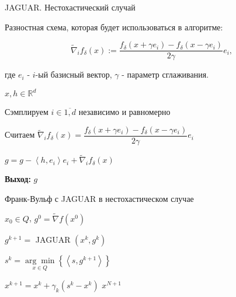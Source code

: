 \documentclass{beamer}
\newcommand{\dotprod}[2]{\left\langle #1,#2 \right\rangle}
\begin{document}
\begin{frame}{JAGUAR. Нестохастический случай}

    Разностная схема, которая будет использоваться в алгоритме:

        \begin{equation*}
            \widetilde{\nabla}_if_\delta(x) :=  \dfrac{f_\delta(x + \gamma e_i) - f_\delta(x - \gamma e_i)}{2 \gamma} e_i,
        \end{equation*}

    где $e_i$ - $i$-ый базисный вектор, $\gamma$ - параметр сглаживания.

    \begin{algorithm}[H]
    	\caption{JAGUAR. Нестохастический случай}        	
        \begin{algorithmic}[1]
        	 $x, h \in \mathbb{R}^d$
          
            \State Сэмплируем $i \in \overline{1, d}$ независимо и равномерно
    
            \State Считаем $\widetilde{\nabla}_i f_{\delta}(x) = \dfrac{f_{\delta}(x + \gamma e_i) - f_{\delta}(x - \gamma e_i)}{2 \gamma} e_i$
    
            \State $g = g - \dotprod{h}{e_i} e_i + \widetilde{\nabla}_i f_{\delta}(x)$
        
            \State \textbf{Выход:} $g$ 
            \end{algorithmic}
    \end{algorithm}


\end{frame}


\begin{frame}{Франк-Вульф с JAGUAR в нестохастическом случае}
    
        \begin{algorithm}[H]
            \caption{ФВ с JAGUAR в нестохастическом случае}
            \begin{algorithmic}[1]
                 $x_0 \in Q$, $g^0 = \widetilde\nabla f(x^0)$
                
                    \State $g^{k+1} = $ JAGUAR $\left( x^k, g^k \right)$ 
                    
                    \State $s^k = \underset{x \in Q}{\arg\min}\left\{\left<s, g^{k+1} \right> \right\}$
                    
                    \State $x^{k+1} = x^k + \gamma_k (s^k - x^k)$ \label{line:x^k}
                \EndFor
             $x^{N+1}$ 
        	\end{algorithmic}
        \end{algorithm}
        
\end{frame}
\end{document}

